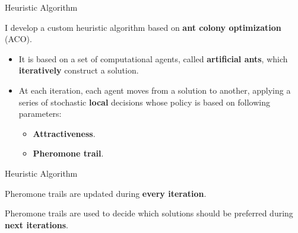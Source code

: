 \documentclass[13.5pt]{beamer}
\newcommand{\B}[1]{\textcolor{TorVergataColor}{\textbf{#1}}}
\begin{document}
\begin{frame}{Heuristic Algorithm}
	
	\begin{block}{}
		\centering
		I develop a custom heuristic algorithm based on \B{ant colony optimization} (ACO).
	\end{block}
	\vspace{\baselineskip}
	\begin{itemize}
		\item It is based on a set of computational agents, called \B{artificial ants}, which \B{iteratively} construct a solution.
		
		\vspace{\baselineskip}
		
		\item At each iteration, each agent moves from a solution to another, applying a series of stochastic \B{local} decisions whose policy is based on following parameters:
		
		\begin{itemize}
			\item \B{Attractiveness}.
			\item \B{Pheromone trail}.
		\end{itemize}
		
	\end{itemize}
	
	
	
	
\end{frame}
\begin{frame}{Heuristic Algorithm}
	
	\begin{block}{}
		\centering
		Pheromone trails are updated during \B{every iteration}.
	\end{block}

	\begin{block}{}
		\centering
		Pheromone trails are used to decide which solutions should be preferred during \B{next iterations}.
	\end{block}

	\vspace{\baselineskip}

\end{frame}
\end{document}
